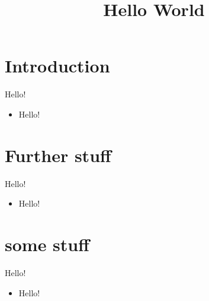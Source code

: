 \documentclass{beamer}
\title{Hello World}
\begin{document}
\maketitle

\section{Introduction}

\begin{frame}{Hello!}
  \begin{itemize}
    \item Hello!
  \end{itemize}
\end{frame}

\section{Further stuff}

\begin{frame}{Hello!}
  \begin{itemize}
    \item Hello!
  \end{itemize}
\end{frame}

\section{some stuff}

\begin{frame}{Hello!}
  \begin{itemize}
    \item Hello!
  \end{itemize}
\end{frame}
\end{document}
